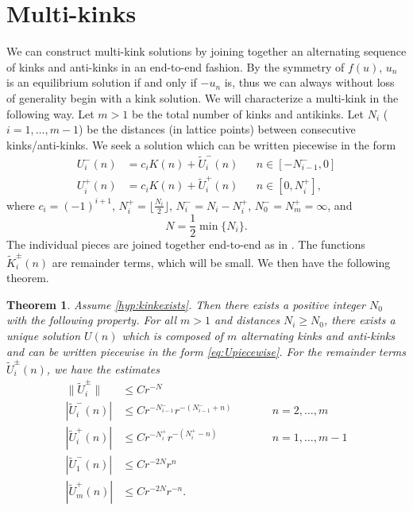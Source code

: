 \documentclass[12pt]{article}
\newtheorem{theorem}{Theorem}
\begin{document}
\section{Multi-kinks}

We can construct multi-kink solutions by joining together an alternating sequence of kinks and anti-kinks in an end-to-end fashion. By the symmetry of $f(u)$, $u_n$ is an equilibrium solution if and only if $-u_n$ is, thus we can always without loss of generality begin with a kink solution. We will characterize a multi-kink in the following way. Let $m > 1$ be the total number of kinks and antikinks. Let $N_i$ ($i = 1, \dots, m-1$) be the distances (in lattice points) between consecutive kinks/anti-kinks. We seek a solution which can be written piecewise in the form 
\begin{equation}\label{eq:Upiecewise}
\begin{aligned}
U_i^-(n) &= c_i K(n) + \tilde{U}_i^-(n) && n \in [-N_{i-1}^-, 0] \\
U_i^+(n) &= c_i K(n) + \tilde{U}_i^+(n) && n \in [0, N_i^+],
\end{aligned}
\end{equation}
where $c_i = (-1)^{i+1}$, $N_i^+ = \lfloor \frac{N_i}{2} \rfloor$, $N_i^- = N_i - N_i^+$, $N_0^- = N_m^+ = \infty$, and
\begin{equation}\label{defN}
N = \frac{1}{2} \min\{ N_i \}.
\end{equation}
The individual pieces are joined together end-to-end as in \cites{Sandstede1998,Parker2020}. The functions $\tilde{K}_i^\pm(n)$ are remainder terms, which will be small. We then have the following theorem.

\begin{theorem}\label{th:KaKexists}
Assume \cref{hyp:kinkexists}. Then there exists a positive integer $N_0$ with the following property. For all $m > 1$ and distances $N_i \geq N_0$, there exists a unique solution $U(n)$ which is composed of $m$ alternating kinks and anti-kinks and can be written piecewise in the form \cref{eq:Upiecewise}. For the remainder terms $\tilde{U}_i^\pm(n)$, we have the estimates
\begin{equation}\label{eq:Uestimates}
\begin{aligned}
\|\tilde{U}_i^\pm\| &\leq C r^{-N} \\
| \tilde{U}_i^-(n) | &\leq C r^{-N_{i-1}^-} r^{-(N_{i-1}^- + n)} && \qquad n = 2, \dots, m\\
|\tilde{U}_i^+(n)| &\leq C r^{-N_i^+} r^{-(N_i^+ - n)} && \qquad n = 1, \dots, m-1 \\
| \tilde{U}_1^-(n) | &\leq C r^{-2N} r^{n} \\
|\tilde{U}_m^+(n)| &\leq C r^{-2N} r^{-n} .
\end{aligned}
\end{equation}
\end{theorem}
\end{document}
